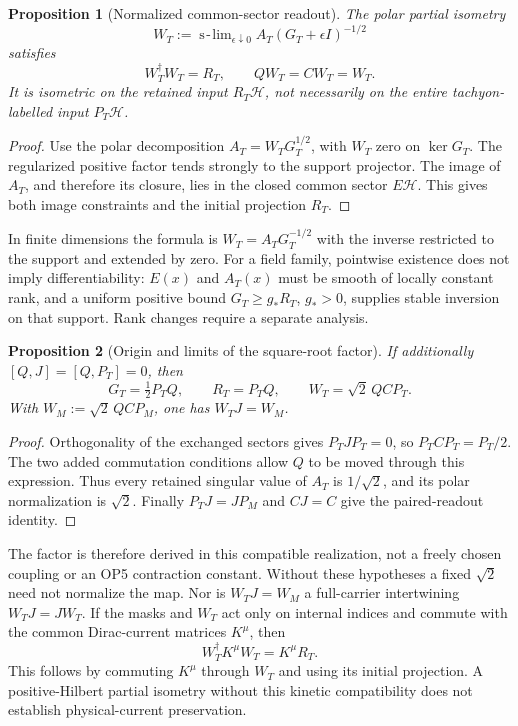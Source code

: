 \documentclass[11pt,a4paper]{article}
\newtheorem{proposition}{Proposition}
\begin{document}
\begin{proposition}[Normalized common-sector readout]
The polar partial isometry
\[
 W_T:=\mathop{\mathrm{s\!-\!lim}}_{\epsilon\downarrow0}
       A_T(G_T+\epsilon I)^{-1/2}
\]
satisfies
\[
 W_T^\dagger W_T=R_T,\qquad QW_T=CW_T=W_T.
\]
It is isometric on the retained input $R_T\mathcal H$, not necessarily
on the entire tachyon-labelled input $P_T\mathcal H$.
\end{proposition}
\begin{proof}
Use the polar decomposition $A_T=W_TG_T^{1/2}$, with $W_T$ zero on
$\ker G_T$. The regularized positive factor tends strongly to the
support projector. The image of $A_T$, and therefore its closure,
lies in the closed common sector $E\mathcal H$. This gives both
image constraints and the initial projection $R_T$.
\end{proof}

In finite dimensions the formula is $W_T=A_TG_T^{-1/2}$ with the
inverse restricted to the support and extended by zero. For a field
family, pointwise existence does not imply differentiability:
$E(x)$ and $A_T(x)$ must be smooth of locally constant rank, and a
uniform positive bound $G_T\ge g_*R_T$, $g_*>0$, supplies stable
inversion on that support. Rank changes require a separate analysis.

\begin{proposition}[Origin and limits of the square-root factor]
If additionally $[Q,J]=[Q,P_T]=0$, then
\[
 G_T=\tfrac12P_TQ,\qquad R_T=P_TQ,
 \qquad W_T=\sqrt2\,QC P_T.
\]
With $W_M:=\sqrt2\,QC P_M$, one has $W_TJ=W_M$.
\end{proposition}
\begin{proof}
Orthogonality of the exchanged sectors gives $P_TJP_T=0$, so
$P_TCP_T=P_T/2$. The two added commutation conditions allow $Q$
to be moved through this expression. Thus every retained singular
value of $A_T$ is $1/\sqrt2$, and its polar normalization is $\sqrt2$.
Finally $P_TJ=JP_M$ and $CJ=C$ give the paired-readout identity.
\end{proof}

The factor is therefore derived in this compatible realization,
not a freely chosen coupling or an OP5 contraction constant. Without
these hypotheses a fixed $\sqrt2$ need not normalize the map.
Nor is $W_TJ=W_M$ a full-carrier intertwining $W_TJ=JW_T$.
If the masks and $W_T$ act only on internal indices and commute with
the common Dirac-current matrices $K^\mu$, then
\[
 W_T^\dagger K^\mu W_T=K^\mu R_T.
\]
This follows by commuting $K^\mu$ through $W_T$ and using its initial
projection. A positive-Hilbert partial isometry without this kinetic
compatibility does not establish physical-current preservation.
\end{document}
